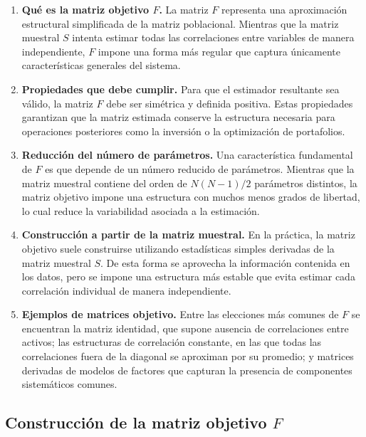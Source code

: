 \documentclass[letterpaper,12pt,oneside]{book}
\begin{document}
\begin{enumerate}

\item \textbf{Qué es la matriz objetivo $F$.}  
La matriz $F$ representa una aproximación estructural simplificada de la matriz poblacional. Mientras que la matriz muestral $S$ intenta estimar todas las correlaciones entre variables de manera independiente, $F$ impone una forma más regular que captura únicamente características generales del sistema.

\item \textbf{Propiedades que debe cumplir.}  
Para que el estimador resultante sea válido, la matriz $F$ debe ser simétrica y definida positiva. Estas propiedades garantizan que la matriz estimada conserve la estructura necesaria para operaciones posteriores como la inversión o la optimización de portafolios.

\item \textbf{Reducción del número de parámetros.}  
Una característica fundamental de $F$ es que depende de un número reducido de parámetros. Mientras que la matriz muestral contiene del orden de $N(N-1)/2$ parámetros distintos, la matriz objetivo impone una estructura con muchos menos grados de libertad, lo cual reduce la variabilidad asociada a la estimación.

\item \textbf{Construcción a partir de la matriz muestral.}  
En la práctica, la matriz objetivo suele construirse utilizando estadísticas simples derivadas de la matriz muestral $S$. De esta forma se aprovecha la información contenida en los datos, pero se impone una estructura más estable que evita estimar cada correlación individual de manera independiente.

\item \textbf{Ejemplos de matrices objetivo.}  
Entre las elecciones más comunes de $F$ se encuentran la matriz identidad, que supone ausencia de correlaciones entre activos; las estructuras de correlación constante, en las que todas las correlaciones fuera de la diagonal se aproximan por su promedio; y matrices derivadas de modelos de factores que capturan la presencia de componentes sistemáticos comunes.

\end{enumerate}

\subsection*{Construcción de la matriz objetivo $F$}
\end{document}
